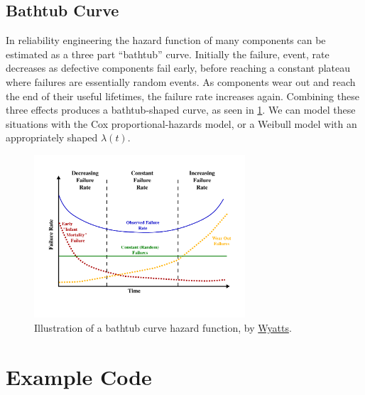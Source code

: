 \subsection{Bathtub Curve}
\label{survival:additional:bathtub}

In reliability engineering the hazard function of many components
can be estimated as a three part ``bathtub'' curve.
Initially the failure, \ie event, rate decreases as defective components fail early,
before reaching a constant plateau where failures are essentially random events.
As components wear out and reach the end of their useful lifetimes, the failure rate increases again.
Combining these three effects produces a bathtub-shaped curve, as seen in \cref{fig:bathtub_curve}.
We can model these situations with the Cox proportional-hazards model,
or a Weibull model with an appropriately shaped $\lambda\left(t\right)$.

\begin{figure}[H]
\centering
\includegraphics[width=0.7\textwidth]{figures/survival/bathtub_curve}
\vspace{0.2cm}
\caption{
Illustration of a bathtub curve hazard function, by \href{https://en.wikipedia.org/wiki/File:Bathtub_curve.svg}{Wyatts}.
}
\label{fig:bathtub_curve}
\end{figure}

\section{Example \R Code}
\label{survival:Rcode}


